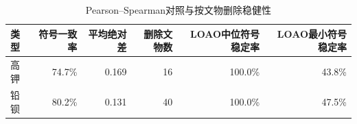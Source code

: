 \begin{table}[H]
  \centering
  \caption{Pearson--Spearman对照与按文物删除稳健性}
  \label{tab:p4-robustness}
  \small
  \begin{tabular}{lrrrrr}
    \toprule
    类型 & 符号一致率 & 平均绝对差 & 删除文物数 & LOAO中位符号稳定率 & LOAO最小符号稳定率 \\
    \midrule
    高钾 & 74.7\% & 0.169 & 16 & 100.0\% & 43.8\% \\
    铅钡 & 80.2\% & 0.131 & 40 & 100.0\% & 47.5\% \\
    \bottomrule
  \end{tabular}
\end{table}

